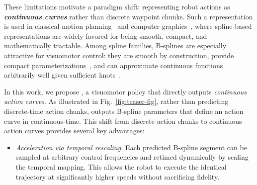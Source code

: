 
\vspace{-5pt}
These limitations motivate a paradigm shift: representing robot actions as \emph{\textbf{continuous curves}} rather than discrete waypoint chunks. Such a representation is used in classical motion planning~\cite{to-pnp-with-bsplines,to-via-bsplines,bsplines-based-trajectory-design,bspline-on-gcs} and computer graphics~\cite{bspline-in-cad-cg,intro-bspline-graphics}, where spline-based representations are widely favored for being smooth, compact, and mathematically tractable. Among spline families, B-splines are especially attractive for visuomotor control: they are smooth by construction, provide compact parameterizations~\cite{splines-guide,calculating-with-B-splines,fitting-bspline}, and can approximate continuous functions arbitrarily well given sufficient knots~\cite{approximation-bspilnes,splines-guide}.


In this work, we propose \our, a visuomotor policy that directly outputs {\it continuous action curves}.
%
As illustrated in Fig.~\ref{fig:teaser-fig}, rather than predicting discrete-time action chunks, \our outputs B-spline parameters that define an action curve in continuous-time. This shift from discrete action chunks to continuous action curves provides several key advantages:

\vspace{-9pt}

\begin{itemize}[leftmargin=3mm]
    \item \textit{Acceleration via temporal rescaling.} 
    Each predicted B-spline segment can be sampled at arbitrary control frequencies and retimed dynamically by scaling the temporal mapping. This allows the robot to execute the identical trajectory at significantly higher speeds without sacrificing fidelity.
\end{itemize}

